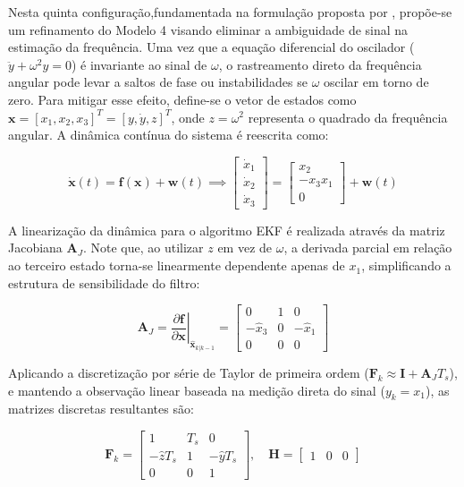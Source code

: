\documentclass[a4paper,12pt]{article}
\begin{document}
Nesta quinta configuração,fundamentada na formulação proposta por ,  propõe-se um refinamento do Modelo 4 visando eliminar a ambiguidade de sinal na estimação da frequência. Uma vez que a equação diferencial do oscilador ($\ddot{y} + \omega^2 y = 0$) é invariante ao sinal de $\omega$, o rastreamento direto da frequência angular pode levar a saltos de fase ou instabilidades se $\omega$ oscilar em torno de zero. Para mitigar esse efeito, define-se o vetor de estados como $\mathbf{x} = [x_1, x_2, x_3]^T = [y, \dot{y}, z]^T$, onde $z = \omega^2$ representa o quadrado da frequência angular. A dinâmica contínua do sistema é reescrita como:

\begin{equation}
    \dot{\mathbf{x}}(t) = \mathbf{f}(\mathbf{x}) + \mathbf{w}(t) \implies \begin{bmatrix} \dot{x}_1 \\ \dot{x}_2 \\ \dot{x}_3 \end{bmatrix} = \begin{bmatrix} x_2 \\ -x_3 x_1 \\ 0 \end{bmatrix} + \mathbf{w}(t)
    \label{eq:mod5_cont_dinamica}
\end{equation}

A linearização da dinâmica para o algoritmo EKF é realizada através da matriz Jacobiana $\mathbf{A}_J$. Note que, ao utilizar $z$ em vez de $\omega$, a derivada parcial em relação ao terceiro estado torna-se linearmente dependente apenas de $x_1$, simplificando a estrutura de sensibilidade do filtro:

\begin{equation}
    \mathbf{A}_J = \left. \frac{\partial \mathbf{f}}{\partial \mathbf{x}} \right|_{\hat{\mathbf{x}}_{k|k-1}} = \begin{bmatrix} 0 & 1 & 0 \\ -\hat{x}_3 & 0 & -\hat{x}_1 \\ 0 & 0 & 0 \end{bmatrix}
    \label{eq:mod5_Jacobiana_A}
\end{equation}

Aplicando a discretização por série de Taylor de primeira ordem ($\mathbf{F}_k \approx \mathbf{I} + \mathbf{A}_J T_s$), e mantendo a observação linear baseada na medição direta do sinal ($y_k = x_1$), as matrizes discretas resultantes são:

\begin{equation}
    \mathbf{F}_k = \begin{bmatrix} 1 & T_s & 0 \\ -\hat{z} T_s & 1 & -\hat{y} T_s \\ 0 & 0 & 1 \end{bmatrix}, \quad \mathbf{H} = \begin{bmatrix} 1 & 0 & 0 \end{bmatrix}
    \label{eq:mod5_matrizes_finais}
\end{equation}
\end{document}

